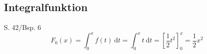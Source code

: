 
\subsection{Integralfunktion}

\begin{Example}{S. 42/Bsp. 6}{}
    \begin{equation*}
        F_{0} (x) = \int_{0}^{x} f(t) \ \mathrm{d}t = \int_{0}^{x} t \ \mathrm{d}t = \left[ \dfrac{1}{2} t^{2} \right]^{x}_{0} = \dfrac{1}{2} x^{2}
    \end{equation*}
\end{Example}
